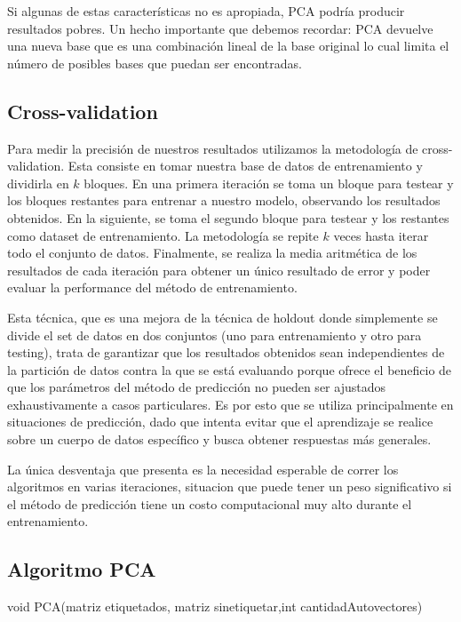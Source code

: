 Si algunas de estas características no es apropiada, PCA podría producir resultados pobres.
Un hecho importante que debemos recordar: PCA devuelve una nueva base que es una combinación lineal de la base original lo cual limita  el número de posibles bases que puedan ser encontradas.

\subsection{Cross-validation}
Para medir la precisión de nuestros resultados utilizamos la metodología de cross-validation. Esta consiste en tomar nuestra base de datos de entrenamiento y dividirla en $k$ bloques. En una primera iteración se toma un bloque para testear y los bloques restantes para entrenar a nuestro modelo, observando los resultados obtenidos. En la siguiente, se toma el segundo bloque para testear y los restantes como dataset de entrenamiento. La metodología se repite $k$ veces hasta iterar todo el conjunto de datos. Finalmente, se realiza la media aritmética de los resultados de cada iteración para obtener un único resultado de error y poder evaluar la performance del método de entrenamiento.


Esta técnica, que es una mejora de la técnica de holdout donde simplemente se divide el set de datos en dos conjuntos (uno para entrenamiento y otro para testing), trata de garantizar que los resultados obtenidos sean independientes de la partición de datos contra la que se está evaluando porque ofrece el beneficio de que los parámetros del método de predicción no pueden ser ajustados exhaustivamente a casos particulares. Es por esto que se utiliza principalmente en situaciones de predicción, dado que intenta evitar que el aprendizaje se realice sobre un cuerpo de datos específico y busca obtener respuestas más generales.


La única desventaja que presenta es la necesidad esperable de correr los algoritmos en varias iteraciones, situacion que puede tener un peso significativo si el método de predicción tiene un costo computacional muy alto durante el entrenamiento. 

\subsection{Algoritmo PCA}

\begin{algorithm}
\begin{algorithmic}[1]\parskip=1mm
\caption{void PCA(matriz etiquetados, matriz sinetiquetar,int cantidadAutovectores)}
\ENDFOR\\
\end{algorithmic}
\end{algorithm}

